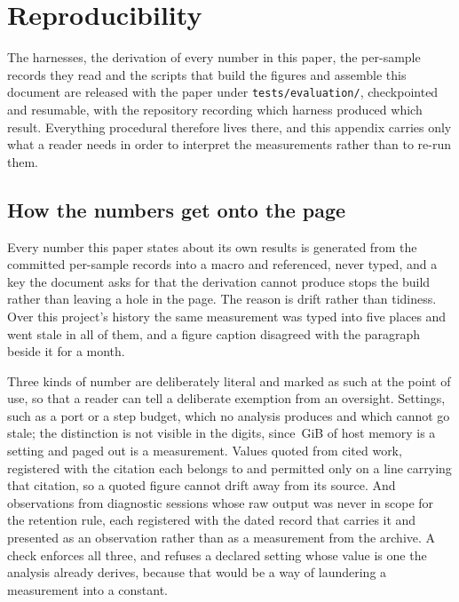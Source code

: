 \section{Reproducibility}
\label{app:repro}

The harnesses, the derivation of every number in this paper, the per-sample records they read and
the scripts that build the figures and assemble this document are released with the paper under
\texttt{tests/evaluation/}, checkpointed and resumable, with the repository recording which harness
produced which result. Everything procedural therefore lives there, and this appendix carries only
what a reader needs in order to interpret the measurements rather than to re-run them.

\subsection{How the numbers get onto the page}\label{numeral-policy}

Every number this paper states about its own results is generated from the committed per-sample
records into a macro and referenced, never typed, and a key the document asks for that the
derivation cannot produce stops the build rather than leaving a hole in the page. The reason is
drift rather than tidiness. Over this project's history the same measurement was typed into five
places and went stale in all of them, and a figure caption disagreed with the paragraph beside it
for a month.

Three kinds of number are deliberately literal and marked as such at the point of use, so that a
reader can tell a deliberate exemption from an oversight. Settings, such as a port or a step budget,
which no analysis produces and which cannot go stale; the distinction is not visible in the digits,
since \,GiB of host memory is a setting and  paged out is a
measurement. Values quoted from cited work, registered with the citation each belongs to and
permitted only on a line carrying that citation, so a quoted figure cannot drift away from its
source. And observations from diagnostic sessions whose raw output was never in scope for the
retention rule, each registered with the dated record that carries it and presented as an
observation rather than as a measurement from the archive. A check enforces all three, and refuses a
declared setting whose value is one the analysis already derives, because that would be a way of
laundering a measurement into a constant.

